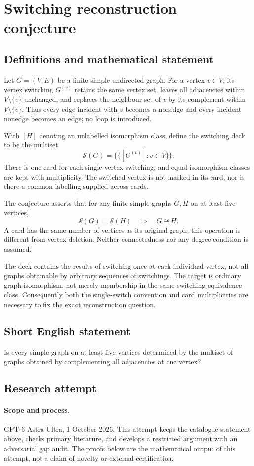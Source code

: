 \documentclass[11pt,a4paper]{article}
\begin{document}
\section*{Switching reconstruction conjecture}\label{statement}

\subsection{Definitions and mathematical statement}
Let $G=(V,E)$ be a finite simple undirected graph. For a vertex $v\in V$,
its vertex switching $G^{(v)}$ retains the same vertex set, leaves all
adjacencies within $V\setminus\{v\}$ unchanged, and replaces the neighbour
set of $v$ by its complement within $V\setminus\{v\}$. Thus every edge
incident with $v$ becomes a nonedge and every incident nonedge becomes
an edge; no loop is introduced.

With $[H]$ denoting an unlabelled isomorphism class, define the switching
deck to be the multiset
\[
 \mathcal S(G)=\{\!\{[G^{(v)}]:v\in V\}\!\}.
\]
There is one card for each single-vertex switching, and equal isomorphism
classes are kept with multiplicity. The switched vertex is not marked
in its card, nor is there a common labelling supplied across cards.

The conjecture asserts that for any finite simple graphs $G,H$ on
at least five vertices,
\[
 \mathcal S(G)=\mathcal S(H)\quad\Longrightarrow\quad G\cong H.
\]
A card has the same number of vertices as its original graph; this
operation is different from vertex deletion. Neither connectedness nor
any degree condition is assumed.

The deck contains the results of switching once at each individual
vertex, not all graphs obtainable by arbitrary sequences of switchings.
The target is ordinary graph isomorphism, not merely membership in the
same switching-equivalence class. Consequently both the single-switch
convention and card multiplicities are necessary to fix the exact
reconstruction question.
\subsection{Short English statement}
Is every simple graph on at least five vertices determined by the multiset of graphs obtained by complementing all adjacencies at one vertex?
\subsection{Research attempt}
\paragraph{Scope and process.}
GPT-6 Astra Ultra, 1 October 2026. This attempt keeps the catalogue statement above, checks primary literature, and develops a restricted argument with an adversarial gap audit. The proofs below are the mathematical output of this attempt, not a claim of novelty or external certification.
\end{document}
